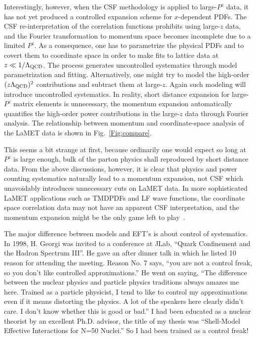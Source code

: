 \documentclass[prd,aps,twocolumn,preprintnumbers,showpacs,nofootinbib,superscriptaddress,notitlepage]{revtex4-1}
\begin{document}
Interestingly, however, when the CSF methodology is applied to
large-$P^z$ data, it has not yet produced a controlled expansion scheme for
$x$-dependent PDFs. The CSF re-interpretation of the correlation
functions prohibits using large-$z$ data, and the Fourier transformation to
momentum space becomes incomplete due to a limited $P^z$.
As a consequence, one has to parametrize the physical PDFs and to covert
them to coordinate space in order to make fits to lattice data at
$z\ll 1/\Lambda_{\rm QCD}$. The process generates uncontrolled systematics
through model parametrization and fitting. Alternatively, one
might try to model the high-order $(z\Lambda_{\rm QCD})^2$ contributions
and subtract them at large-$z$. Again such modeling will introduce
uncontrolled systematics. In reality, short distance expansion for
large-$P^z$ matrix elements is unnecessary, the momentum expansion
automatically quantifies the high-order power contributions
in the large-$z$ data through Fourier analysis. The relationship between
momentum and coordinate-space analysis of the
LaMET data is shown in Fig.~\ref{Fig:compare}.

This seems a bit strange at first, because ordinarily one
would expect so long at $P^z$ is large enough, bulk of the parton
physics shall reproduced by short distance data. From the above
discussions, however, it is clear that physics and power counting
systematics naturally lead to a momentum expansion,
not CSF which unavoidably introduces unnecessary cuts
on LaMET data. In more sophisticated
LaMET applications such as TMDPDFs and LF wave functions, the
coordinate space correlation data may not have an apparent CSF interpretation,
and the momentum expansion might be the only
game left to play~\cite{Ji:2020ect}.

The major difference between models and EFT's is about control of systematics.
In 1998, H. Georgi was invited to a conference at JLab,
``Quark Confinement and the Hadron Spectrum III''.
He gave an after dinner talk in which he listed 10 reason for
attending the meeting. Reason No. 7 says, ``you are
not a control freak, so you don't like controlled approximations.''
He went on saying, ``The difference between the nuclear physics
and particle physics traditions always amazes me here. Trained
as a particle physicist, I tend to like to control my approximations
even if it means distorting the physics. A lot of the speakers
here clearly didn't care. I don't know whether this is good or bad.''
I had been educated as a nuclear theorist by an excellent Ph.D. advisor,
the title of my thesis was ``Shell-Model Effective Interactions for N=50 Nuclei.''
So I had been trained as a control freak!
\end{document}
